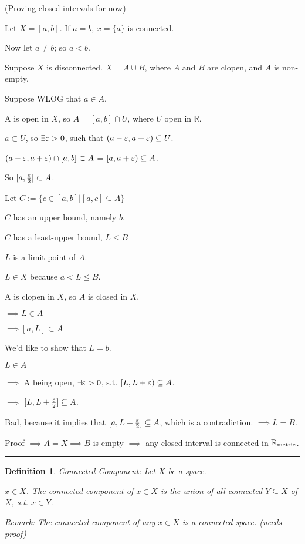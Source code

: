 \documentclass[twoside]{article}
\newtheorem{definition}[theorem]{Definition}
\newenvironment{proof}{{\bf Proof:}}{\hfill\rule{2mm}{2mm}}
\newcommand\R{\mathbb{R}}
\begin{document}
\begin{proof}
    (Proving closed intervals for now)

    Let $X = [a,b]$. If $a = b$, $x = \{a\}$ is connected. 

    Now let $a \neq b$; so $a < b$.

    Suppose $X$ is disconnected. $X = A \cup B$, where $A$ and $B$ are clopen, and $A$ is non-empty. 

    Suppose WLOG that $a \in A$. 

    A is open in $X$, so $A = [a,b] \cap U$, where $U$ open in $\R$. 
    
    $a \subset U$, so $\exists \varepsilon > 0$, such that $(a - \varepsilon, a + \varepsilon) \subseteq U$. 

    $(a - \varepsilon, a+\varepsilon) \cap [a,b] \subset A$ = $[a, a+\varepsilon) \subseteq A$. 

    So $[a, \frac{\varepsilon}2] \subset A$.

    Let $C := \{c \in [a,b] \vert [a,c] \subseteq A\}$

    $C$ has an upper bound, namely $b$. 

    $C$ has a least-upper bound, $L \leq B$

    $L$ is a limit point of $A$. 

    $L \in X$ because $a < L \leq B$.

    A is clopen in $X$, so $A$ is closed in $X$.

    $\implies L \in A$

    $\implies [a,L] \subset A$

    We'd like to show that $L = b$. 

    $L \in A$

    $\implies$ A being open, $\exists \varepsilon > 0$, s.t. $[L, L + \varepsilon) \subseteq A$.
    
    $\implies$ $[L, L + \frac{\varepsilon}2] \subseteq A$. 

    Bad, because it implies that $[a, L + \frac{\varepsilon}2] \subseteq A$, which is a contradiction. $\implies L = B$. 

    Proof $\implies A = X \implies B$ is empty $\implies$ any closed interval is connected in $\Rm$. 
\end{proof}

\begin{definition}
    Connected Component: Let $X$ be a space. 

    $x \in X$. The connected component of $x \in X$ is the union of all connected $Y \subseteq X$ of $X$, s.t. $x \in Y$.

    Remark: The connected component of any $x \in X$ is a connected space. (needs proof)

\end{definition}
\end{document}
